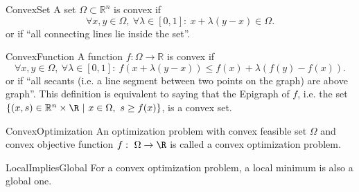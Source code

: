 \begin{theo}{ConvexSet}
    A set $\Omega \subset \mathbb{R}^n$ is convex if 
    \begin{equation*}
        \forall x,y \in \Omega, \ \forall \lambda \in [0,1]: \ x + \lambda(y - x) \in \Omega.
    \end{equation*}
    or if ``all connecting lines lie inside the set''.

\end{theo}

\begin{theo}{ConvexFunction}
    A function $f: \Omega \rightarrow \mathbb{R}$ is convex if 
    \begin{equation*}
        \forall x,y \in \Omega, \ \forall \lambda \in [0,1]: \ f(x + \lambda(y - x)) \leq f(x) + \lambda(f(y) - f(x)).
    \end{equation*}
    or if ``all secants (i\@.e\@. a line segment between two points on the graph) are above graph''. This definition is equivalent to saying that the Epigraph of $f$, i\@.e\@. the set $\{(x,s) \in \mathbb{R}^n \times \R \ | \ x \in \Omega, \ s \geq f(x) \}$, is a convex set.
    \vspace*{-0.1cm}
\end{theo}

\begin{theo}{ConvexOptimization}
    An optimization problem with convex feasible set $\Omega$ and convex objective function $f: \ \Omega \rightarrow \R$ is called a convex optimization problem. 
\end{theo}

\newpage

\begin{theo}{LocalImpliesGlobal}
    For a convex optimization problem, a local minimum is also a global one.
\end{theo}


